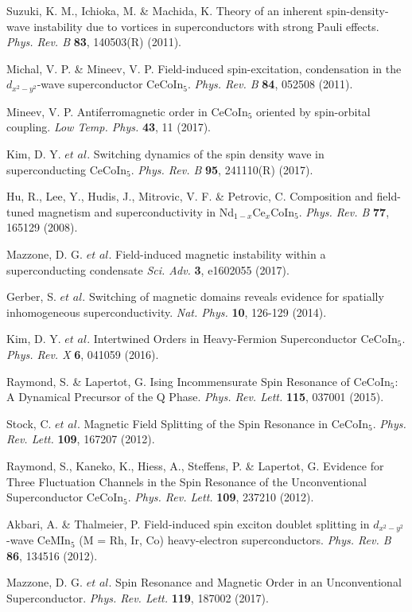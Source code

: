 \documentclass[article,twocolumn,showpacs,preprintnumbers,amsmath,amssymb, superscriptaddress]{revtex4-1}
\begin{document}
\begin{thebibliography}{20}
Suzuki, K. M., Ichioka, M. \& Machida, K.
\newblock Theory of an inherent spin-density-wave instability due to vortices in superconductors with strong Pauli effects.
\newblock \textit{Phys. Rev. B} \textbf{83}, 140503(R) (2011).

Michal, V. P. \& Mineev, V. P.
\newblock Field-induced spin-excitation, condensation in the $d_{x^2-y^2}$-wave superconductor CeCoIn$_5$.
\newblock \textit{Phys. Rev. B} \textbf{84}, 052508 (2011).

Mineev, V. P.
\newblock Antiferromagnetic order in CeCoIn$_5$ oriented by spin-orbital coupling.
\newblock \textit{Low Temp. Phys.} \textbf{43}, 11 (2017).

Kim, D. Y. $et$ $al.$
\newblock Switching dynamics of the spin density wave in superconducting CeCoIn$_5$.
\newblock \textit{Phys. Rev. B} \textbf{95}, 241110(R) (2017).

Hu, R., Lee, Y., Hudis, J., Mitrovic, V. F. \& Petrovic, C. 
\newblock Composition and field-tuned magnetism and superconductivity in Nd$_{1-x}$Ce$_x$CoIn$_5$.
\newblock \textit{Phys. Rev. B} \textbf{77}, 165129 (2008).

Mazzone, D. G. $et$ $al.$
\newblock Field-induced magnetic instability within a superconducting condensate
\newblock \textit{Sci. Adv.} \textbf{3}, e1602055 (2017).

Gerber, S. $et$ $al.$
\newblock Switching of magnetic domains reveals evidence for spatially inhomogeneous superconductivity.
\newblock \textit{Nat. Phys.} \textbf{10}, 126-129 (2014).

Kim, D. Y. $et$ $al.$
\newblock Intertwined Orders in Heavy-Fermion Superconductor CeCoIn$_5$.
\newblock \textit{Phys. Rev. X} \textbf{6}, 041059 (2016).

Raymond, S. \& Lapertot, G.
\newblock Ising Incommensurate Spin Resonance of CeCoIn$_5$: A Dynamical Precursor of the Q Phase.
\newblock \textit{Phys. Rev. Lett.} \textbf{115}, 037001 (2015). 

Stock, C. $et$ $al.$
\newblock Magnetic Field Splitting of the Spin Resonance in CeCoIn$_5$.
\newblock \textit{Phys. Rev. Lett.} \textbf{109}, 167207 (2012).

Raymond, S., Kaneko, K., Hiess, A., Steffens, P. \& Lapertot, G. 
\newblock Evidence for Three Fluctuation Channels in the Spin Resonance of the Unconventional Superconductor CeCoIn$_5$.
\newblock \textit{Phys. Rev. Lett.} \textbf{109}, 237210 (2012).

Akbari, A. \&  Thalmeier, P. 
\newblock Field-induced spin exciton doublet splitting in $d_{x^2 - y^2}$-wave CeMIn$_5$ (M = Rh, Ir, Co) heavy-electron superconductors.
\newblock \textit{Phys. Rev. B} \textbf{86}, 134516 (2012).

Mazzone, D. G. $et$ $al.$ 
\newblock Spin Resonance and Magnetic Order in an Unconventional Superconductor.
\newblock \textit{Phys. Rev. Lett.} \textbf{119}, 187002 (2017).
\end{thebibliography}
\end{document}
